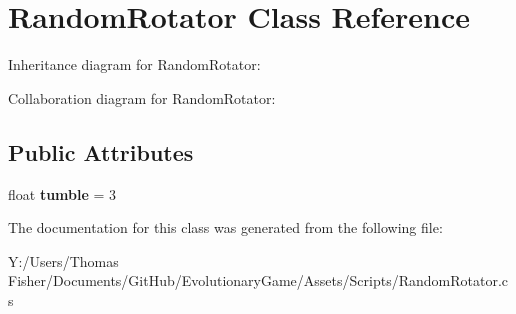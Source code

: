 \hypertarget{class_random_rotator}{}\section{Random\+Rotator Class Reference}
\label{class_random_rotator}


Inheritance diagram for Random\+Rotator\+:


Collaboration diagram for Random\+Rotator\+:
\subsection*{Public Attributes}
\begin{DoxyCompactItemize}
\item 
\mbox{\label{class_random_rotator_afaec47e23d30e8bd3161a628d9338e92}} 
float {\bfseries tumble} = 3
\end{DoxyCompactItemize}


The documentation for this class was generated from the following file\+:\begin{DoxyCompactItemize}
\item 
Y\+:/\+Users/\+Thomas Fisher/\+Documents/\+Git\+Hub/\+Evolutionary\+Game/\+Assets/\+Scripts/Random\+Rotator.\+cs\end{DoxyCompactItemize}
